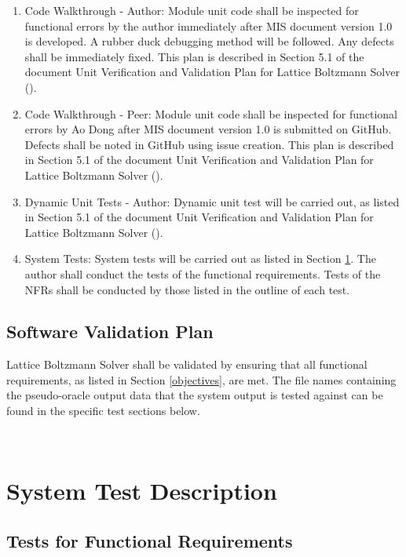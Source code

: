 \documentclass[12pt, titlepage]{article}
\newcommand{\famname}{Lattice Boltzmann Solver}
\begin{document}
\begin{enumerate}
\item Code Walkthrough - Author: Module unit code shall be inspected for functional errors by the author immediately after MIS document version 1.0 is developed. A rubber duck debugging method will be followed. Any defects shall be immediately fixed. This plan is described in Section 5.1 of the document Unit Verification and Validation Plan for Lattice Boltzmann Solver (\citet{LBM_UVNV_PM}).
\item Code Walkthrough - Peer: Module unit code shall be inspected for functional errors by Ao Dong after MIS document version 1.0 is submitted on GitHub. Defects shall be noted in GitHub using issue creation. This plan is described in Section 5.1 of the document Unit Verification and Validation Plan for Lattice Boltzmann Solver (\citet{LBM_UVNV_PM}).
\item Dynamic Unit Tests - Author: Dynamic unit test will be carried out, as listed in Section 5.1 of the document Unit Verification and Validation Plan for Lattice Boltzmann Solver (\citet{LBM_UVNV_PM}).
\item System Tests: System tests will be carried out as listed in Section \ref{systest}. The author shall conduct the tests of the functional requirements. Tests of the NFRs shall be conducted by those listed in the outline of each test.
\end{enumerate}



\subsection{Software Validation Plan}

{\famname} shall be validated by ensuring that all functional requirements, as listed in Section \ref{objectives}, are met. The file names containing the pseudo-oracle output data that the system output is tested against can be found in the specific test sections below.


~\newpage	 


\section{System Test Description}

\label{systest}


\subsection{Tests for Functional Requirements}
\end{document}
